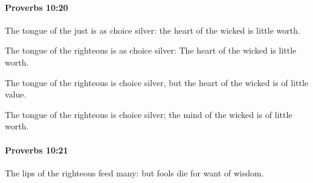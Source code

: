 		\paragraph{Proverbs 10:20} %
			\label{PROVERBS-10-20}

			The tongue of the just is as choice silver: the heart of the wicked is little worth.

			\begin{versebox}
					\item[BHS] 
					\item[ASV] The tongue of the righteous is as choice silver: The heart of the wicked is little worth.
					\item[NIV] The tongue of the righteous is choice silver, but the heart of the wicked is of little value.
					\item[NRSV] The tongue of the righteous is choice silver; the mind of the wicked is of little worth.
			\end{versebox}

		\paragraph{Proverbs 10:21} %
			\label{PROVERBS-10-21}

			The lips of the righteous feed many: but fools die for want of wisdom.

